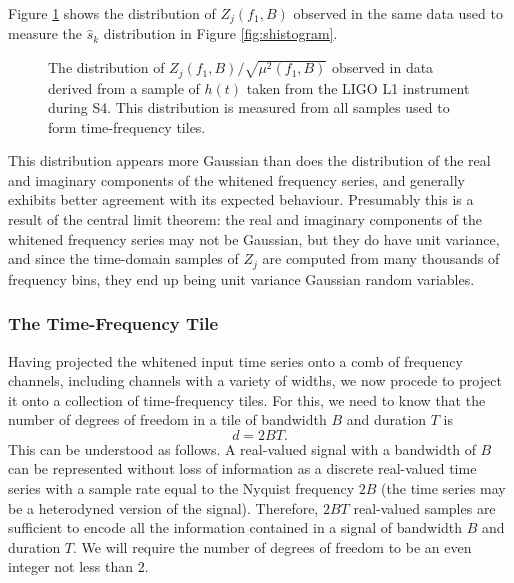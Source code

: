 \documentclass[10pt]{article}
\begin{document}
Figure \ref{fig:Zhistogram} shows the distribution of \(Z_{j}(f_{1}, B)\)
observed in the same data used to measure the \(\hat{s}_{k}\) distribution
in Figure \ref{fig:shistogram}.
\begin{figure}
\begin{center}
\end{center}
\caption{The distribution of \(Z_{j}(f_{1}, B) / \sqrt{\mu^{2}(f_{1}, B)}\)
observed in data derived from a sample of \(h(t)\) taken from the LIGO L1
instrument during S4.  This distribution is measured from all samples used
to form time-frequency tiles.}
\label{fig:Zhistogram}
\end{figure}
This distribution appears more Gaussian than does the distribution of the
real and imaginary components of the whitened frequency series, and
generally exhibits better agreement with its expected behaviour.
Presumably this is a result of the central limit theorem:  the real and
imaginary components of the whitened frequency series may not be Gaussian,
but they do have unit variance, and since the time-domain samples of
\(Z_{j}\) are computed from many thousands of frequency bins, they end up
being unit variance Gaussian random variables.


\subsubsection{The Time-Frequency Tile}


Having projected the whitened input time series onto a comb of frequency
channels, including channels with a variety of widths, we now procede to
project it onto a collection of time-frequency tiles.  For this, we need to
know that the number of degrees of freedom in a tile of bandwidth \(B\) and
duration \(T\) is
\begin{equation}
d
   = 2 B T.
\end{equation}
This can be understood as follows.  A real-valued signal with a bandwidth
of \(B\) can be represented without loss of information as a discrete
real-valued time series with a sample rate equal to the Nyquist frequency
\(2 B\) (the time series may be a heterodyned version of the signal).
Therefore, \(2 B T\) real-valued samples are sufficient to encode all the
information contained in a signal of bandwidth \(B\) and duration \(T\).
We will require the number of degrees of freedom to be an even integer not
less than 2.
\end{document}
